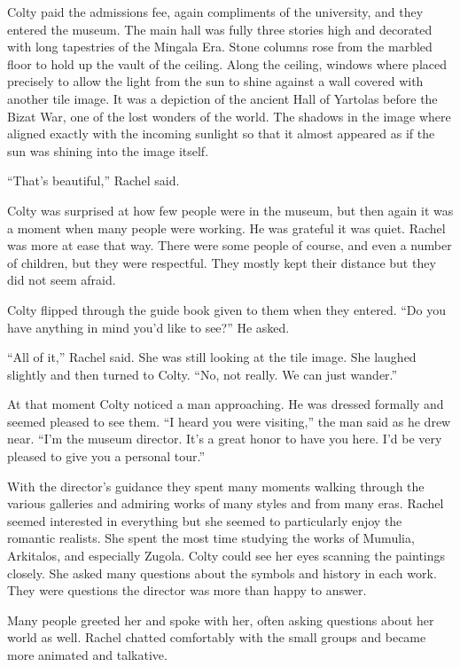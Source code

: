 Colty paid the admissions fee, again compliments of the university, and they entered the museum.
The main hall was fully three stories high and decorated with long tapestries of the Mingala
Era. Stone columns rose from the marbled floor to hold up the vault of the ceiling. Along the
ceiling, windows where placed precisely to allow the light from the sun to shine against a wall
covered with another tile image. It was a depiction of the ancient Hall of Yartolas before the
Bizat War, one of the lost wonders of the world. The shadows in the image where aligned exactly
with the incoming sunlight so that it almost appeared as if the sun was shining into the image
itself.

``That's beautiful,'' Rachel said.

Colty was surprised at how few people were in the museum, but then again it was a moment when
many people were working. He was grateful it was quiet. Rachel was more at ease that way. There
were some people of course, and even a number of children, but they were respectful. They mostly
kept their distance but they did not seem afraid.

Colty flipped through the guide book given to them when they entered. ``Do you have anything in
mind you'd like to see?'' He asked.

``All of it,'' Rachel said. She was still looking at the tile image. She laughed slightly and
then turned to Colty. ``No, not really. We can just wander.''

At that moment Colty noticed a man approaching. He was dressed formally and seemed pleased to
see them. ``I heard you were visiting,'' the man said as he drew near. ``I'm the museum
director. It's a great honor to have you here. I'd be very pleased to give you a personal
tour.''

With the director's guidance they spent many moments walking through the various galleries and
admiring works of many styles and from many eras. Rachel seemed interested in everything but she
seemed to particularly enjoy the romantic realists. She spent the most time studying the works
of Mumulia, Arkitalos, and especially Zugola. Colty could see her eyes scanning the paintings
closely. She asked many questions about the symbols and history in each work. They were
questions the director was more than happy to answer.

Many people greeted her and spoke with her, often asking questions about her world as well.
Rachel chatted comfortably with the small groups and became more animated and talkative.

